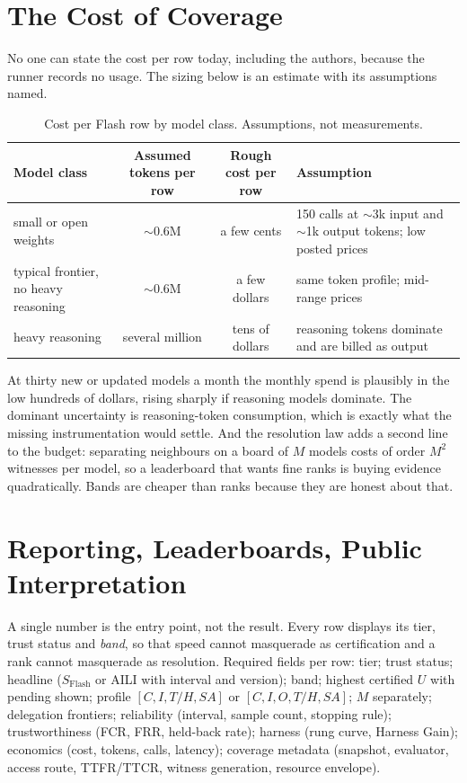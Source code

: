 \section{The Cost of Coverage}\label{sec:cost}

No one can state the cost per row today, including the authors, because the runner records no usage. The sizing below is an estimate with its assumptions named.

\begin{table}[!htbp]
\centering\small
\begin{tabularx}{\textwidth}{@{}l c c Y@{}}
\toprule
Model class & Assumed tokens per row & Rough cost per row & Assumption \\
\midrule
small or open weights & $\sim$0.6M & a few cents & 150 calls at $\sim$3k input and $\sim$1k output tokens; low posted prices \\
typical frontier, no heavy reasoning & $\sim$0.6M & a few dollars & same token profile; mid-range prices \\
heavy reasoning & several million & tens of dollars & reasoning tokens dominate and are billed as output \\
\bottomrule
\end{tabularx}
\caption{Cost per Flash row by model class. Assumptions, not measurements.}
\label{tab:cost}
\end{table}

At thirty new or updated models a month the monthly spend is plausibly in the low hundreds of dollars, rising sharply if reasoning models dominate. The dominant uncertainty is reasoning-token consumption, which is exactly what the missing instrumentation would settle. And the resolution law adds a second line to the budget: separating neighbours on a board of $M$ models costs of order $M^2$ witnesses per model, so a leaderboard that wants fine ranks is buying evidence quadratically. Bands are cheaper than ranks because they are honest about that.

\section{Reporting, Leaderboards, Public Interpretation}\label{sec:public}

A single number is the entry point, not the result. Every row displays its tier, trust status and \emph{band}, so that speed cannot masquerade as certification and a rank cannot masquerade as resolution. Required fields per row: tier; trust status; headline ($S_{\mathrm{Flash}}$ or AILI with interval and version); band; highest certified $U$ with pending shown; profile $[C, I, T/H, SA]$ or $[C, I, O, T/H, SA]$; $M$ separately; delegation frontiers; reliability (interval, sample count, stopping rule); trustworthiness (FCR, FRR, held-back rate); harness (rung curve, Harness Gain); economics (cost, tokens, calls, latency); coverage metadata (snapshot, evaluator, access route, TTFR/TTCR, witness generation, resource envelope).

